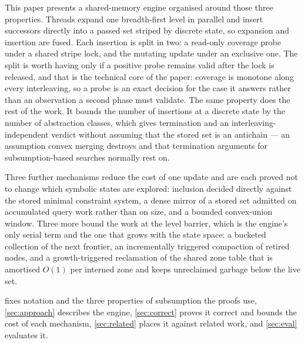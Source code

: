 This paper presents a shared-memory engine organised around those three
properties.  Threads expand one breadth-first level in parallel and insert
successors directly into a passed set striped by discrete state, so expansion and
insertion are fused.  Each insertion is split in two: a read-only coverage probe
under a shared stripe lock, and the mutating update under an exclusive one.  The
split is worth having only if a positive probe remains valid after the lock is
released, and that is the technical core of the paper: coverage is monotone along
every interleaving, so a probe is an exact decision for the case it answers
rather than an observation a second phase must validate.  The same property does
the rest of the work.  It bounds the number of insertions at a discrete state by
the number of abstraction classes, which gives termination and an
interleaving-independent verdict without assuming that the stored set is an
antichain --- an assumption convex merging destroys and that termination
arguments for subsumption-based searches normally rest on.

Three further mechanisms reduce the cost of one update and are each proved not to
change which symbolic states are explored: inclusion decided directly against the
stored minimal constraint system, a dense mirror of a stored set admitted on
accumulated query work rather than on size, and a bounded convex-union window.
Three more bound the work at the level barrier, which is the engine's only serial
term and the one that grows with the state space: a bucketed collection of the
next frontier, an incrementally triggered compaction of retired nodes, and a
growth-triggered reclamation of the shared zone table that is amortised $O(1)$
per interned zone and keeps unreclaimed garbage below the live set.

 fixes notation and the three properties of subsumption the
proofs use, \cref{sec:approach} describes the engine, \cref{sec:correct} proves
it correct and bounds the cost of each mechanism, \cref{sec:related} places it
against related work, and \cref{sec:eval} evaluates it.
